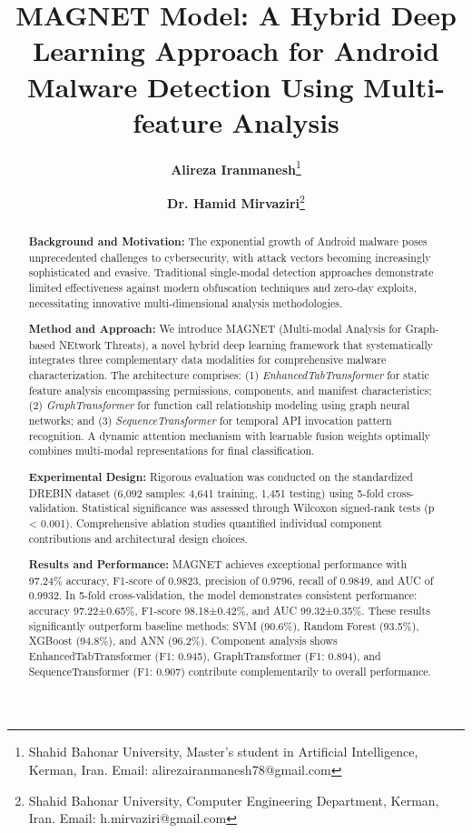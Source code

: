 \documentclass[a4paper,11pt]{article}
\begin{document}
\title{\Large\textbf{MAGNET Model: A Hybrid Deep Learning Approach for Android Malware Detection Using Multi-feature Analysis}}
\author{
  \textbf{Alireza Iranmanesh}\thanks{Shahid Bahonar University, Master's student in Artificial Intelligence, Kerman, Iran. Email: alirezairanmanesh78@gmail.com} \and
  \textbf{Dr. Hamid Mirvaziri}\thanks{Shahid Bahonar University, Computer Engineering Department, Kerman, Iran. Email: h.mirvaziri@gmail.com}
}
\maketitle
\vspace{-1em}

\begin{abstract}

\textbf{Background and Motivation:} The exponential growth of Android malware poses unprecedented challenges to cybersecurity, with attack vectors becoming increasingly sophisticated and evasive. Traditional single-modal detection approaches demonstrate limited effectiveness against modern obfuscation techniques and zero-day exploits, necessitating innovative multi-dimensional analysis methodologies.

\textbf{Method and Approach:} We introduce MAGNET (Multi-modal Analysis for Graph-based NEtwork Threats), a novel hybrid deep learning framework that systematically integrates three complementary data modalities for comprehensive malware characterization. The architecture comprises: (1) \textit{EnhancedTabTransformer} for static feature analysis encompassing permissions, components, and manifest characteristics; (2) \textit{GraphTransformer} for function call relationship modeling using graph neural networks; and (3) \textit{SequenceTransformer} for temporal API invocation pattern recognition. A dynamic attention mechanism with learnable fusion weights optimally combines multi-modal representations for final classification.

\textbf{Experimental Design:} Rigorous evaluation was conducted on the standardized DREBIN dataset (6,092 samples: 4,641 training, 1,451 testing) using 5-fold cross-validation. Statistical significance was assessed through Wilcoxon signed-rank tests (p < 0.001). Comprehensive ablation studies quantified individual component contributions and architectural design choices.

\textbf{Results and Performance:} MAGNET achieves exceptional performance with 97.24\% accuracy, F1-score of 0.9823, precision of 0.9796, recall of 0.9849, and AUC of 0.9932. In 5-fold cross-validation, the model demonstrates consistent performance: accuracy 97.22±0.65\%, F1-score 98.18±0.42\%, and AUC 99.32±0.35\%. These results significantly outperform baseline methods: SVM (90.6\%), Random Forest (93.5\%), XGBoost (94.8\%), and ANN (96.2\%). Component analysis shows EnhancedTabTransformer (F1: 0.945), GraphTransformer (F1: 0.894), and SequenceTransformer (F1: 0.907) contribute complementarily to overall performance.


\end{abstract}
\end{document}
